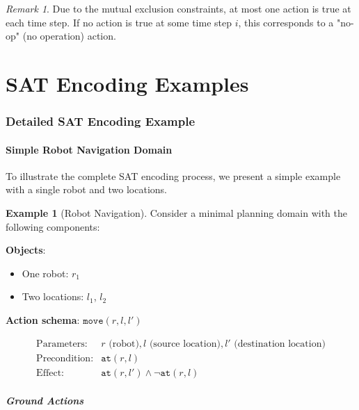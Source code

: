 \documentclass[11pt,a4paper]{article}
\theoremstyle{definition}
\newtheorem{example}{Example}[section]
\theoremstyle{plain}
\theoremstyle{remark}
\newtheorem*{remark}{Remark}
\begin{document}
\begin{remark}
Due to the mutual exclusion constraints, at most one action is true at each time step. If no action is true at some time step \( i \), this corresponds to a "no-op" (no operation) action.
\end{remark}



\newpage

\part{SAT Encoding Examples}

\section{Detailed SAT Encoding Example}

\subsection{Simple Robot Navigation Domain}

To illustrate the complete SAT encoding process, we present a simple example with a single robot and two locations.

\begin{example}[Robot Navigation]
Consider a minimal planning domain with the following components:

\textbf{Objects}:
\begin{itemize}
    \item One robot: $r_1$
    \item Two locations: $l_1$, $l_2$
\end{itemize}

\textbf{Action schema}: $\texttt{move}(r, l, l')$

\[
\begin{array}{ll}
\text{Parameters:} & r \text{ (robot)}, l \text{ (source location)}, l' \text{ (destination location)} \\
\text{Precondition:} & \texttt{at}(r, l) \\
\text{Effect:} & \texttt{at}(r, l') \land \neg \texttt{at}(r, l)
\end{array}
\]
\end{example}

\subsubsection{Ground Actions}
\end{document}
